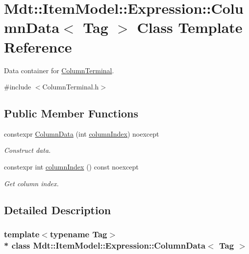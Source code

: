 \hypertarget{class_mdt_1_1_item_model_1_1_expression_1_1_column_data}{}\section{Mdt\+:\+:Item\+Model\+:\+:Expression\+:\+:Column\+Data$<$ Tag $>$ Class Template Reference}
\label{class_mdt_1_1_item_model_1_1_expression_1_1_column_data}


Data container for \hyperlink{struct_mdt_1_1_item_model_1_1_expression_1_1_column_terminal}{Column\+Terminal}.  




{\ttfamily \#include $<$Column\+Terminal.\+h$>$}

\subsection*{Public Member Functions}
\begin{DoxyCompactItemize}
\item 
constexpr \hyperlink{class_mdt_1_1_item_model_1_1_expression_1_1_column_data_af3d80a0b3b89dfb43b2ec9e5aa8c9830}{Column\+Data} (int \hyperlink{class_mdt_1_1_item_model_1_1_expression_1_1_column_data_a4b1fe4c2ba24831001ddc94dce685097}{column\+Index}) noexcept
\begin{DoxyCompactList}\small\item\em Construct data. \end{DoxyCompactList}\item 
constexpr int \hyperlink{class_mdt_1_1_item_model_1_1_expression_1_1_column_data_a4b1fe4c2ba24831001ddc94dce685097}{column\+Index} () const noexcept\hypertarget{class_mdt_1_1_item_model_1_1_expression_1_1_column_data_a4b1fe4c2ba24831001ddc94dce685097}{}\label{class_mdt_1_1_item_model_1_1_expression_1_1_column_data_a4b1fe4c2ba24831001ddc94dce685097}

\begin{DoxyCompactList}\small\item\em Get column index. \end{DoxyCompactList}\end{DoxyCompactItemize}


\subsection{Detailed Description}
\subsubsection*{template$<$typename Tag$>$\\*
class Mdt\+::\+Item\+Model\+::\+Expression\+::\+Column\+Data$<$ Tag $>$}

